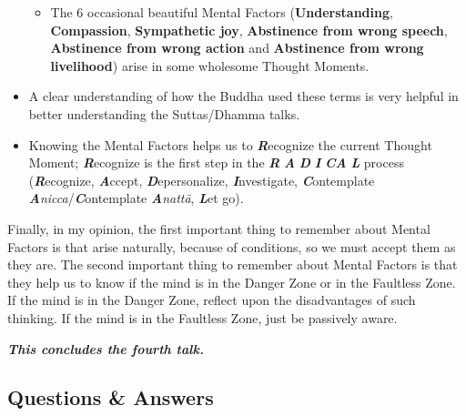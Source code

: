 \begin{itemize}
\begin{itemize}
\item The 6 occasional beautiful Mental Factors (\textbf{Understanding}, \textbf{Compassion}, \textbf{Sympathetic joy}, \textbf{Abstinence from wrong speech}, \textbf{Abstinence from wrong action} and \textbf{Abstinence from wrong livelihood}) arise in some wholesome Thought Moments.

\end{itemize}

\item A clear understanding of how the Buddha used these terms is very helpful in better understanding the Suttas/Dhamma talks.

\item Knowing the Mental Factors helps us to \textbf{\textit{R}}ecognize the current Thought Moment; \textbf{\textit{R}}ecognize is the first step in the \textbf{\textit{R}} \textbf{\textit{A}} \textbf{\textit{D}} \textbf{\textit{I}} \textbf{\textit{CA}} \textbf{\textit{L}} process (\textbf{\textit{R}}ecognize, \textbf{\textit{A}}ccept, \textbf{\textit{D}}epersonalize, \textbf{\textit{I}}nvestigate, \textbf{\textit{C}}ontemplate \textbf{\textit{A}}\textit{nicca}/\textbf{\textit{C}}ontemplate \textbf{\textit{A}}\textit{nattā}, \textbf{\textit{L}}et go).

\end{itemize}

Finally, in my opinion, the first important thing to remember about Mental Factors is that arise naturally, because of conditions, so we must accept them as they are. The second important thing to remember about Mental Factors is that they help us to know if the mind is in the Danger Zone or in the Faultless Zone. If the mind is in the Danger Zone, reflect upon the disadvantages of such thinking. If the mind is in the Faultless Zone, just be passively aware.

\begin{center}
\textbf{\textit{This concludes the fourth talk.}} \\
\end{center}

\newpage

\subsection*{Questions \& Answers}


